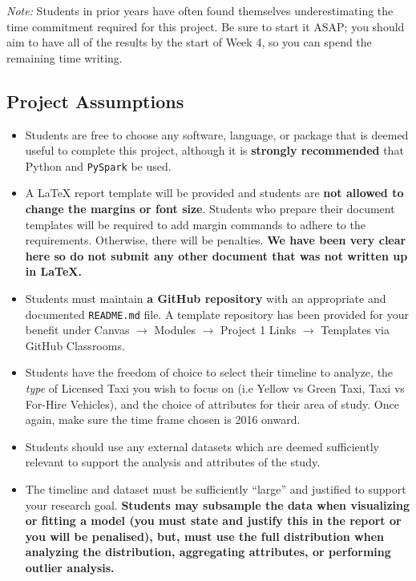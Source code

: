 \documentclass[12pt]{article}
\begin{document}
\emph{Note:} Students in prior years have often found themselves underestimating the time commitment required for this project. Be sure to start it ASAP; you should aim to have all of the results by the start of Week 4, so you can spend the remaining time writing. 

\subsection*{Project Assumptions}
\begin{itemize}
    \item Students are free to choose any software, language, or package that is deemed useful to complete this project, although it is \textbf{strongly recommended} that Python and \texttt{PySpark} be used.
    \item A LaTeX report template will be provided and students are \textbf{not allowed to change the margins or font size}. Students who prepare their document templates will be required to add margin commands to adhere to the requirements. Otherwise, there will be penalties. \textbf{We have been very clear here so do not submit any other document that was not written up in LaTeX.}
    \item Students must maintain \textbf{a GitHub repository} with an appropriate and documented \texttt{README.md} file. A template repository has been provided for your benefit under Canvas $\rightarrow$ Modules $\rightarrow$ Project 1 Links $\rightarrow$ Templates via GitHub Classrooms.
    \item Students have the freedom of choice to select their timeline to analyze, the \textit{type} of Licensed Taxi you wish to focus on (i.e Yellow vs Green Taxi, Taxi vs For-Hire Vehicles), and the choice of attributes for their area of study. Once again, make sure the time frame chosen is 2016 onward.
    \item Students should use any external datasets which are deemed sufficiently relevant to support the analysis and attributes of the study. 
    \item The timeline and dataset must be sufficiently ``large'' and justified to support your research goal. \textbf{Students may subsample the data when visualizing or fitting a model (you must state and justify this in the report or you will be penalised), but, must use the full distribution when analyzing the distribution, aggregating attributes, or performing outlier analysis.}
\end{itemize}
\end{document}
